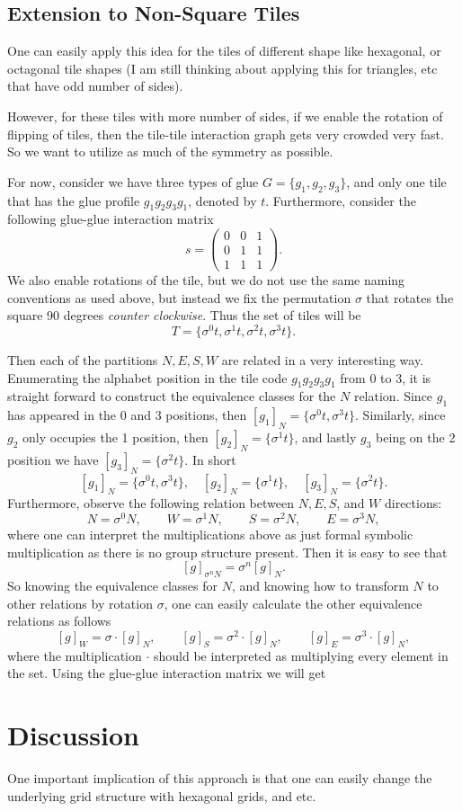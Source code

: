 \documentclass[11pt,a4paper]{article}
\theoremstyle{definition}
\theoremstyle{remark}
\theoremstyle{definition}
\begin{document}
	
	
	\subsection{Extension to Non-Square Tiles}
	One can easily apply this idea for the tiles of different shape like hexagonal, or octagonal tile shapes (I am still thinking about applying this for triangles, etc that have odd number of sides). 
	
	However, for these tiles with more number of sides, if we enable the rotation of flipping of tiles, then the tile-tile interaction graph gets very crowded very fast. So we want to utilize as much of the symmetry as possible.
	
	For now, consider we have three types of glue $ G = \{g_1,g_2,g_3\} $, and only one tile  that has the glue profile $  g_1g_2g_3g_1  $, denoted by $ t $. Furthermore, consider the following glue-glue interaction matrix
	\[ s = \begin{pmatrix}
		0 & 0 & 1 \\
		0 & 1 & 1 \\
		1 & 1 & 1 
	\end{pmatrix}. \]
	 We also enable rotations of the tile, but we do not use the same naming conventions as used above, but instead we fix the permutation $ \sigma $ that rotates the square 90 degrees \textit{counter clockwise}. Thus the set of tiles will be
	\[ T = \{ \sigma^0 t, \sigma^1 t, \sigma^2 t, \sigma^3 t \}. \]
	
	Then each of the partitions $ N,E,S,W $ are related in a very interesting way. Enumerating the alphabet position in the tile code $ g_1g_2g_3g_1 $ from $ 0 $ to $ 3 $, it is straight forward to construct the equivalence classes for the $ N $ relation. Since $ g_1 $ has appeared in the 0 and 3 positions, then $ [g_1]_N = \{\sigma^0t, \sigma^3t\} $. Similarly, since $ g_2 $ only occupies the 1 position, then $ [g_2]_N =\{ \sigma^1 t\} $, and lastly $ g_3 $ being on the 2 position we have $ [g_3]_N = \{\sigma^2 t\} $. In short
	\[ [g_1]_N = \{ \sigma^0 t, \sigma^3 t \},\quad [g_2]_N = \{\sigma^1t\}, \quad [g_3]_N = \{ \sigma^2t \}. \]
	Furthermore, observe the following relation between $ N,E,S $, and $ W $ directions:
	\[ N = \sigma^0 N, \qquad W = \sigma^1 N, \qquad S = \sigma^2 N, \qquad E = \sigma^3 N, \]
	where one can interpret the multiplications above as just formal symbolic multiplication as there is no group structure present. Then it is easy to see that
	\[ [g]_{\sigma^n N} = \sigma^n [g]_{N}. \]
	So knowing the equivalence classes for $ N $, and knowing how to transform $ N $ to other relations by rotation $ \sigma $, one can easily calculate the other equivalence relations as follows
	\[ [g]_W = \sigma\cdot [g]_N, \qquad [g]_S = \sigma^2\cdot [g]_N, \qquad [g]_E = \sigma^3\cdot [g]_N, \]
	where the multiplication $ \cdot $ should be interpreted as multiplying every element in the set. Using the glue-glue interaction matrix we will get
	
 	\FloatBarrier
	
	
	\section{Discussion}
	One important implication of this approach is that one can easily change the underlying grid structure with hexagonal grids, and etc.
	
	
	
\end{document}
